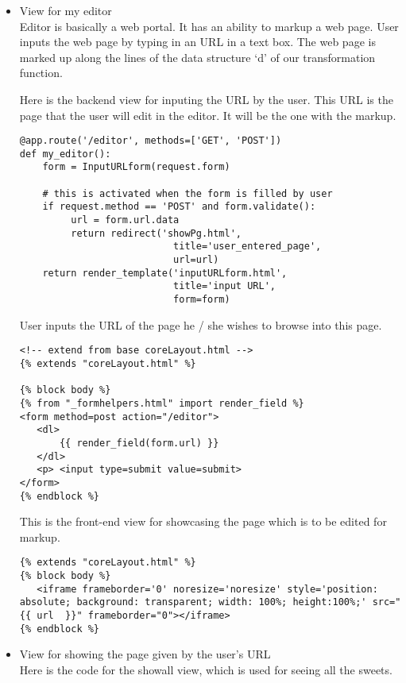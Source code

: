 \documentclass[11pt]{article}
\begin{document}
\begin{itemize}

\item View for my editor\\
\label{sec-4-2-2-1}%
Editor is basically a web portal. It has an ability to markup a web
page. User inputs the web page by typing in an URL in a text box. The
web page is marked up along the lines of the data structure `d' of our
transformation function.

Here is the backend view for inputing the URL by the user. This URL is the
page that the user will edit in the editor. It will be the one with
the markup.

\begin{verbatim}
@app.route('/editor', methods=['GET', 'POST'])
def my_editor():
    form = InputURLform(request.form) 

    # this is activated when the form is filled by user
    if request.method == 'POST' and form.validate():
         url = form.url.data
         return redirect('showPg.html', 
                           title='user_entered_page', 
                           url=url)
    return render_template('inputURLform.html',
                           title='input URL',
                           form=form)
\end{verbatim}


User inputs the URL of the page he / she wishes to browse into this
page.

\begin{verbatim}
<!-- extend from base coreLayout.html -->
{% extends "coreLayout.html" %}

{% block body %}
{% from "_formhelpers.html" import render_field %}
<form method=post action="/editor">
   <dl>
       {{ render_field(form.url) }}
   </dl>
   <p> <input type=submit value=submit>
</form>
{% endblock %}
\end{verbatim}

This is the front-end view for showcasing the page which is to be
edited for markup. 

\begin{verbatim}
{% extends "coreLayout.html" %}
{% block body %}
   <iframe frameborder='0' noresize='noresize' style='position: absolute; background: transparent; width: 100%; height:100%;' src="{{ url  }}" frameborder="0"></iframe>   
{% endblock %}
\end{verbatim}



\item View for showing the page given by the user's URL\\
\label{sec-4-2-2-2}%
Here is the code for the showall view, which is used for seeing all
the sweets.


\end{itemize}
\end{document}
